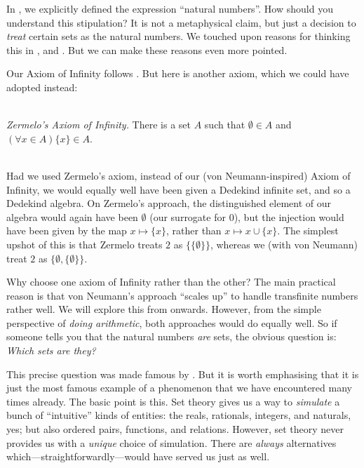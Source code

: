 \documentclass[../../../include/open-logic-section]{subfiles}
\begin{document}
	


In , we explicitly defined
the expression ``natural numbers''. How should you understand this
stipulation? It is not a metaphysical claim, but just a decision to
\emph{treat} certain sets as the natural numbers. We touched upon reasons for thinking this in
,  and
. But we can make these
reasons even more pointed.

Our Axiom of Infinity follows \citet{VonNeumann1925}. But here is
another axiom, which we could have adopted instead:

\
\\\emph{Zermelo's \citeyear{Zermelo1908Untersuchungen} Axiom of Infinity.} There is a set $A$ such that $\emptyset \in A$ and $(\forall x \in A)\{x\} \in A$. 

\
\\
Had we used Zermelo's axiom, instead of our (von Neumann-inspired)
Axiom of Infinity, we would equally well have been given a Dedekind
infinite set, and so a Dedekind algebra. On Zermelo's approach, the
distinguished element of our algebra would again have been $\emptyset$
(our surrogate for $0$), but the injection would have been given by
the map $x \mapsto \{x\}$, rather than $x \mapsto x \cup \{x\}$. The
simplest upshot of this is that Zermelo treats $2$ as
$\{\{\emptyset\}\}$, whereas we (with von Neumann) treat $2$ as
$\{\emptyset, \{\emptyset\}\}$. 

Why choose one axiom of Infinity rather than the other? The main
practical reason is that von Neumann's approach ``scales up'' to
handle transfinite numbers rather well. We will explore this from
\olref[ordinals][]{chap} onwards. However, from the simple
perspective of \emph{doing arithmetic}, both approaches would do
equally well. So if someone tells you that the natural numbers
\emph{are} sets, the obvious question is: \emph{Which sets are they?} 

This precise question was made famous by \citet{Benacerraf1965}. But
it is worth emphasising that it is just the most famous example of a
phenomenon that we have encountered many times already. The basic
point is this. Set theory gives us a way to \emph{simulate} a bunch of
``intuitive'' kinds of entities: the reals, rationals, integers, and
naturals, yes; but also ordered pairs, functions, and relations.
However, set theory never provides us with a \emph{unique} choice of
simulation. There are \emph{always} alternatives
which---straightforwardly---would have served us just as well. 
\end{document}
